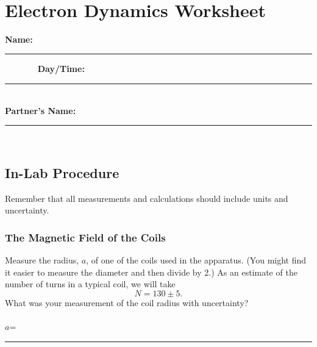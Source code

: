 \ \\
\vfill
\pagebreak
$$
$$
\vfill
\clearpage
\newpage

\renewcommand{\thesection}{\thechapter.W}

\section{Electron Dynamics Worksheet}
{\bf \Large Name:}~ \rule{5cm}{.1mm}~~~~~~~
{\bf \Large Day/Time:}~\rule{3cm}{.1mm}\\
{\bf \Large Partner's Name:}~\rule{6cm}{.1mm}\\
\subsection{In-Lab Procedure}
\label{sec:ed:proc}

Remember that all measurements and calculations should include units and 
uncertainty.

\subsubsection{The Magnetic Field of the Coils}
\label{sec:ed:bfield}

Measure the radius, $a$, of one of the coils used in the 
apparatus.  (You might find it easier to measure the diameter and then divide 
by 2.) As an estimate of the number of turns in a typical coil, we will take
$$ N = 130 \pm 5. $$  What was 
your measurement of the coil radius with uncertainty? \\
\ \\
\hspace*{5cm} $a$=~\rule{3cm}{.1mm}

